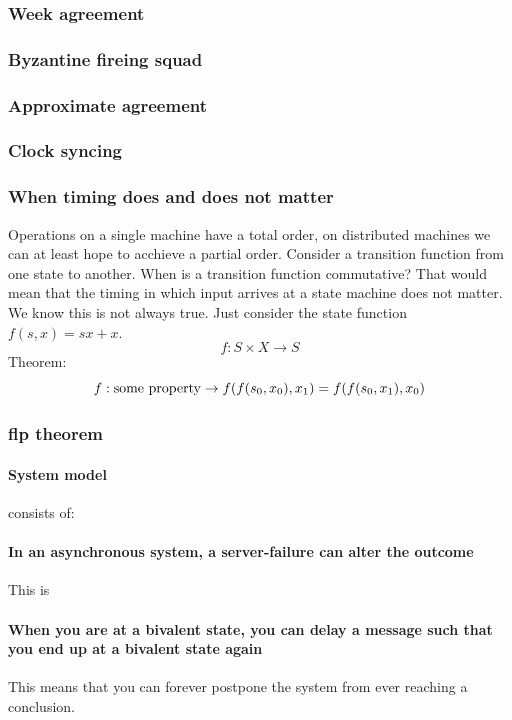 \subsubsection{Week agreement}
\subsubsection{Byzantine fireing squad}
\subsubsection{Approximate agreement}
\subsubsection{Clock syncing}


\subsubsection{When timing does and does not matter}
Operations on a single machine have a total order, on distributed machines we can at least hope to acchieve a partial order.
Consider a transition function from one state to another. When is a transition function commutative? That would mean that the timing in which input arrives at a state machine does not matter. We know this is not always true. Just consider the state function $f(s, x) = sx + x$. 
$$ f : S \times X \to S$$
Theorem:
$$ f: \text{some property} \to f(f(s_0, x_0), x_1) = f(f(s_0, x_1), x_0)$$

\subsubsection{flp theorem}

\paragraph{System model} consists of:
\paragraph{In an asynchronous system, a server-failure can alter the outcome} This is
\paragraph{When you are at a bivalent state, you can delay a message such that you end up at a bivalent state again} This means that you can forever postpone the system from ever reaching a conclusion. 

